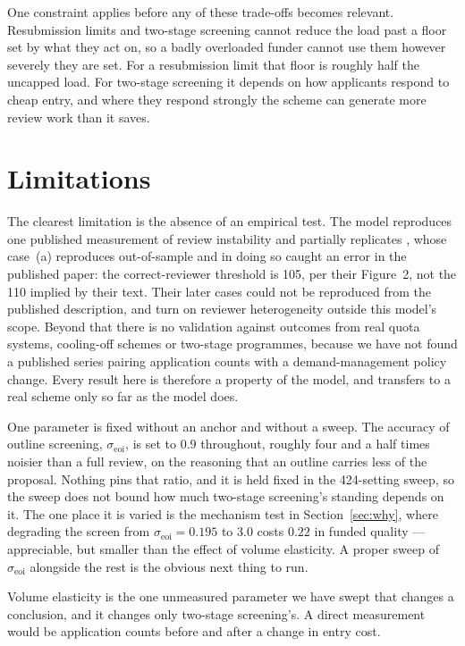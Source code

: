 \documentclass[11pt,a4paper]{article}
\begin{document}
One constraint applies before any of these trade-offs becomes relevant.
Resubmission limits and two-stage screening cannot reduce the load past a floor
set by what they act on, so a badly overloaded funder cannot use them however
severely they are set. For a resubmission limit that floor is roughly half the
uncapped load. For two-stage screening it depends on how applicants respond to
cheap entry, and where they respond strongly the scheme can generate more review
work than it saves.

\section{Limitations}

The clearest limitation is the absence of an empirical test. The model reproduces one
published measurement of review instability and partially replicates
\citet{roebber2011}, whose case~(a) reproduces out-of-sample and in doing so
caught an error in the published paper: the correct-reviewer threshold is 105,
per their Figure~2, not the 110 implied by their text. Their later cases could
not be reproduced from the published description, and turn on reviewer
heterogeneity outside this model's scope. Beyond that there is no validation
against outcomes from real quota systems, cooling-off schemes or two-stage
programmes, because we have not found a published series pairing application
counts with a demand-management policy change. Every result here is therefore a
property of the model, and transfers to a real scheme only so far as the model
does.

One parameter is fixed without an anchor and without a sweep. The accuracy of
outline screening, $\sigma_{\text{eoi}}$, is set to $0.9$ throughout, roughly four
and a half times noisier than a full review, on the reasoning that an outline
carries less of the proposal. Nothing pins that ratio, and it is held fixed in
the 424-setting sweep, so the sweep does not bound how much two-stage screening's
standing depends on it. The one place it is varied is the mechanism test in
Section~\ref{sec:why}, where degrading the screen from $\sigma_{\text{eoi}} =
0.195$ to $3.0$ costs $0.22$ in funded quality --- appreciable, but smaller than
the effect of volume elasticity. A proper sweep of $\sigma_{\text{eoi}}$ alongside
the rest is the obvious next thing to run.

Volume elasticity is the one unmeasured parameter we have swept that changes a
conclusion, and it changes only two-stage screening's. A direct measurement would be application
counts before and after a change in entry cost.
\end{document}
